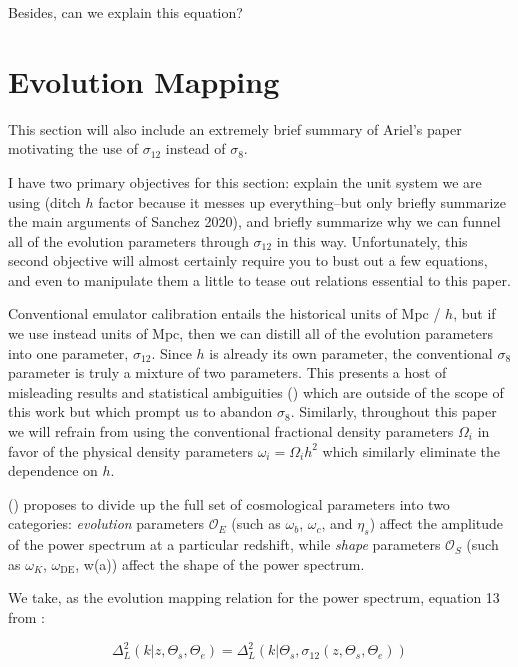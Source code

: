 Besides, can we explain this equation?

\section{Evolution Mapping}

This section will also include an extremely brief summary of Ariel's paper motivating the use of $\sigma_{12}$ instead of $\sigma_8$.

    I have two primary objectives for this section: explain the unit system
    we are using (ditch $h$ factor because it messes up everything--but
    only briefly summarize the main arguments of Sanchez 2020), and briefly
    summarize why we can funnel all of the evolution parameters through
    $\sigma_{12}$ in this way. Unfortunately, this second objective will
    almost certainly require you to bust out a few equations, and even to
    manipulate them a little to tease out relations essential to this paper.

Conventional emulator calibration entails the historical units of Mpc / $h$,
but if we use instead units of Mpc, then we can distill all of the evolution
parameters into one parameter, $\sigma_{12}$. Since $h$ is already its own parameter, the conventional $\sigma_8$ parameter is truly a mixture
of two parameters. This presents a host of misleading results  and statistical
ambiguities () which are outside of the scope of this work but
which prompt us to abandon $\sigma_8$.
Similarly, throughout this paper we will refrain from using the conventional
fractional density parameters $\Omega_i$ in favor of the physical density
parameters $\omega_i = \Omega_i h^2$ which similarly eliminate the
dependence on $h$.

() proposes to divide up the full set of cosmological
parameters into two categories: \textit{evolution} parameters $\mathcal{O}_E$
(such as $\omega_b$, $\omega_c$, and $\eta_s$)
affect the amplitude of the power spectrum at a particular redshift, while
\textit{shape} parameters $\mathcal{O}_S$
(such as $\omega_K$, $\omega_\text{DE}$, w(a))
affect the shape of the power
spectrum.

We take, as the evolution mapping relation for the power spectrum, equation 13
from :

\begin{equation}
\label{eq: evMapping_pSpectrum}
    \Delta^2_L (k | z, \Theta_s, \Theta_e)
    =
    \Delta_L^2 (k | \Theta_s, \sigma_{12} \left( z, \Theta_s, \Theta_e \right))
\end{equation}

